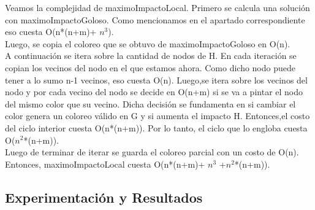 \indent Veamos la complejidad de maximoImpactoLocal. Primero se calcula una solución con maximoImpactoGoloso. Como mencionamos en el apartado correspondiente eso cuesta O(n*(n+m)+ $n^{3}$). \\
\indent Luego, se copia el coloreo que se obtuvo de maximoImpactoGoloso en O(n).\\
\indent A continuación se itera sobre la cantidad de nodos de H. En cada iteración se copian los vecinos del nodo en el que estamos ahora. Como dicho nodo puede tener a lo sumo n-1 vecinos, eso cuesta O(n). Luego,se itera sobre los vecinos del nodo y por cada vecino del nodo se decide en O(n+m) si se va a pintar el nodo del mismo color que su vecino. Dicha decisión se fundamenta en si cambiar el color genera un coloreo válido en G y si aumenta el impacto H. Entonces,el costo del ciclo interior cuesta O(n*(n+m)). Por lo tanto, el ciclo que lo engloba cuesta O($n^{2}$*(n+m)).\\
\indent Luego de terminar de iterar se guarda el coloreo parcial con un costo de O(n).\\
\indent Entonces, maximoImpactoLocal cuesta O(n*(n+m)+ $n^{3}$ +$ n^{2}$*(n+m)).\\

\subsection{Experimentación y Resultados}
